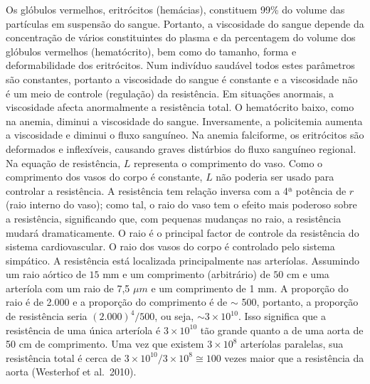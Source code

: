 \documentclass[
  portuguese,
  ]{book}
\begin{document}
Os glóbulos vermelhos, eritrócitos (hemácias), constituem 99\% do volume das partículas em suspensão do sangue. Portanto, a viscosidade do sangue depende da concentração de vários constituintes do plasma e da percentagem do volume dos glóbulos vermelhos (hematócrito), bem como do tamanho, forma e deformabilidade dos eritrócitos. Num indivíduo saudável todos estes parâmetros são constantes, portanto a viscosidade do sangue é constante e a viscosidade não é um meio de controle (regulação) da resistência. Em situações anormais, a viscosidade afecta anormalmente a resistência total. O hematócrito baixo, como na anemia, diminui a viscosidade do sangue. Inversamente, a policitemia aumenta a viscosidade e diminui o fluxo sanguíneo. Na anemia falciforme, os eritrócitos são deformados e inflexíveis, causando graves distúrbios do fluxo sanguíneo regional.
Na equação de resistência, \(L\) representa o comprimento do vaso. Como o comprimento dos vasos do corpo é constante, \(L\) não poderia ser usado para controlar a resistência.
A resistência tem relação inversa com a 4ª potência de \(r\) (raio interno do vaso); como tal, o raio do vaso tem o efeito mais poderoso sobre a resistência, significando que, com pequenas mudanças no raio, a resistência mudará dramaticamente. O raio é o principal factor de controle da resistência do sistema cardiovascular. O raio dos vasos do corpo é controlado pelo sistema simpático.
A resistência está localizada principalmente nas arteríolas. Assumindo um raio aórtico de \(15\) mm e um comprimento (arbitrário) de \(50\) cm e uma arteríola com um raio de 7,5 \(\mu m\) e um comprimento de 1 mm. A proporção do raio é de 2.000 e a proporção do comprimento é de \(\sim\) 500, portanto, a proporção de resistência seria \((2.000)^4/500\), ou seja, \(\sim 3\times10^{10}\). Isso significa que a resistência de uma única arteríola é \(3\times10^{10}\) tão grande quanto a de uma aorta de 50 cm de comprimento. Uma vez que existem \(3\times10^8\) arteríolas paralelas, sua resistência total é cerca de \(3\times10^{10}/3\times10^8 \cong 100\) vezes maior que a resistência da aorta (Westerhof et al.~2010).
\end{document}
